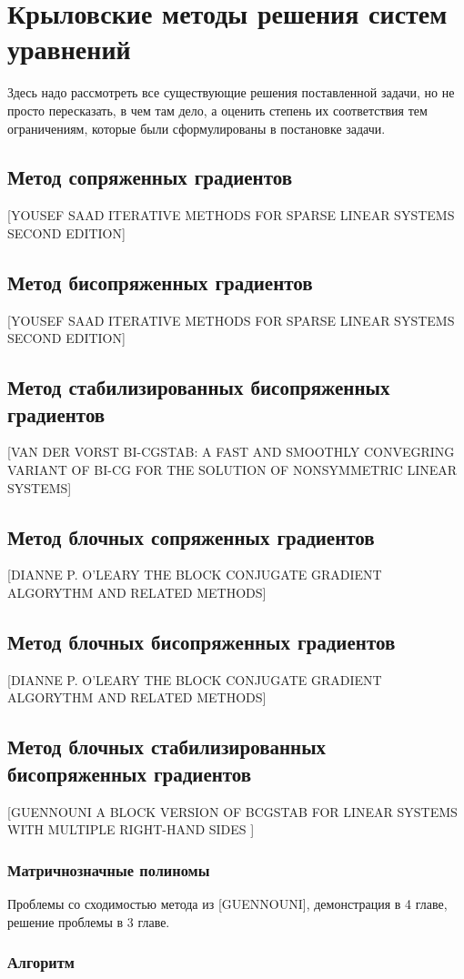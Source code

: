 \section{Крыловские методы решения систем уравнений}
\label{sec:Chapter2} 

Здесь надо рассмотреть все существующие решения поставленной задачи, но не
просто пересказать, в чем там дело, а оценить степень их соответствия тем
ограничениям, которые были сформулированы в постановке задачи.

\subsection{Метод сопряженных градиентов}
[YOUSEF SAAD ITERATIVE METHODS FOR SPARSE LINEAR SYSTEMS SECOND EDITION]
\subsection{Метод бисопряженных градиентов}
[YOUSEF SAAD ITERATIVE METHODS FOR SPARSE LINEAR SYSTEMS SECOND EDITION]
\subsection{Метод стабилизированных бисопряженных градиентов}
[VAN DER VORST BI-CGSTAB: A FAST AND SMOOTHLY CONVEGRING VARIANT OF BI-CG FOR THE SOLUTION OF NONSYMMETRIC LINEAR SYSTEMS]
\subsection{Метод блочных сопряженных градиентов}
[DIANNE P. O'LEARY THE BLOCK CONJUGATE GRADIENT ALGORYTHM AND RELATED METHODS]
\subsection{Метод блочных бисопряженных градиентов}
[DIANNE P. O'LEARY THE BLOCK CONJUGATE GRADIENT ALGORYTHM AND RELATED METHODS]
\subsection{Метод блочных стабилизированных бисопряженных градиентов}
[GUENNOUNI A BLOCK VERSION OF BCGSTAB FOR LINEAR SYSTEMS WITH MULTIPLE RIGHT-HAND SIDES ]
\subsubsection{Матричнозначные полиномы}
 \par Проблемы со сходимостью метода из [GUENNOUNI], демонстрация в 4 главе, решение проблемы в 3 главе.
 \subsubsection{Алгоритм}


\newpage
